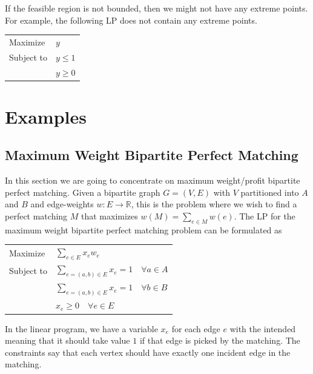 If the feasible region is not bounded, then we might not have any extreme points. For example, the
following LP does not contain any extreme points.
\begin{center}
\begin{tabular}{ll}
  Maximize   & $y$\\
  Subject to & $y\le 1$\\
             & $y\ge 0$
\end{tabular}
\end{center}

\begin{center}
\end{center}

\section{Examples}
\subsection{Maximum Weight Bipartite Perfect Matching}

In this section we are going to concentrate on maximum weight/profit bipartite perfect matching.
Given a bipartite graph $G=(V,E)$ with $V$ partitioned into $A$ and $B$ and edge-weights
$w:E\to\mathbb{R}$, this is the problem where we wish to find a perfect matching $M$ that
maximizes $w(M)=\sum_{e\in M}w(e)$. The LP for the
maximum weight bipartite perfect matching problem can be formulated as
\begin{center}
\begin{tabular}{ll}
  Maximize   & $\displaystyle\sum_{e\in E}x_e w_e$\\[8pt]
  Subject to & $\displaystyle\sum_{e=(a,b)\in E}x_e=1\quad\forall a\in A$\\[8pt]
             & $\displaystyle\sum_{e=(a,b)\in E}x_e=1\quad\forall b\in B$\\[8pt]
             & $x_e\ge 0\quad\forall e\in E$
\end{tabular}
\end{center}

In the linear program, we have a variable $x_e$ for each edge $e$ with the intended meaning that
it should take value $1$ if that edge is picked by the matching. The constraints say that each
vertex should have exactly one incident edge in the matching.

